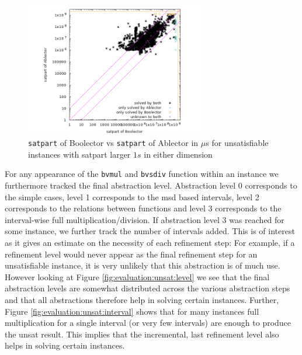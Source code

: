 \begin{figure}[]
    \centering
        \includegraphics[width=0.7\textwidth]{plots/unsat/Boolector-vs-Ablector-satpart-big.png}
    \caption{\texttt{satpart} of Boolector vs \texttt{satpart} of Ablector in $\mu$s for unsatisfiable instances with satpart larger $1s$ in either dimension}
    \label{fig:evaluation:unsat:scatter-big}
\end{figure}
For any appearance of the \texttt{bvmul} and \texttt{bvsdiv} function within an instance we furthermore tracked the final abstraction level. Abstraction level 0 corresponds to the simple cases, level 1 corresponds to the msd based intervals, level 2 corresponds to the relations between functions and level 3 corresponds to the interval-wise full multiplication/division. If abstraction level 3 was reached for some instance, we further track the number of intervals added. This is of interest as it gives an estimate on the necessity of each refinement step: For example, if a refinement level would never appear as the final refinement step for an unsatisfiable instance, it is very unlikely that this abstraction is of much use. However looking at Figure \ref{fig:evaluation:unsat:level} we see that the final abstraction levels are somewhat distributed across the various abstraction steps and that all abstractions therefore help in solving certain instances.
Further, Figure \ref{fig:evaluation:unsat:interval} shows that for many instances full multiplication for a single interval (or very few intervals) are enough to produce the unsat result. This implies that the incremental, last refinement level also helps in solving certain instances.

